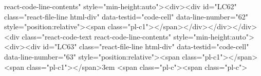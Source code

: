 react-code-line-contents" style="min-height:auto"><div><div id="LC62" class="react-file-line html-div" data-testid="code-cell" data-line-number="62" style="position:relative"><span class="pl-c1">\makeatother</span></div></div></div><div class="react-code-text react-code-line-contents" style="min-height:auto"><div><div id="LC63" class="react-file-line html-div" data-testid="code-cell" data-line-number="63" style="position:relative"><span class="pl-c1">\setlength</span>{<span class="pl-c1">\emergencystretch</span>}{3em} <span class="pl-c"><span class="pl-c">%